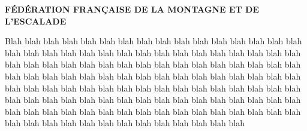 \documentclass{report}
\begin{document}
\begin{center}
\sf\bfseries
F\'ED\'ERATION FRAN\c{C}AISE DE LA MONTAGNE ET DE L'ESCALADE
\end{center}

Blah blah blah blah blah blah blah blah blah blah blah blah blah blah blah blah blah
blah blah blah blah blah blah blah blah blah blah blah blah blah blah blah blah blah blah
blah blah blah blah blah blah blah blah blah blah blah blah blah blah blah blah blah blah
blah blah blah blah blah blah blah blah blah blah blah blah blah blah blah blah blah blah
blah blah blah blah blah blah blah blah blah blah blah blah blah blah blah blah blah blah
blah blah blah blah blah blah blah blah blah blah blah blah blah blah blah blah blah blah
blah blah blah blah blah blah blah blah blah blah blah blah blah blah blah blah blah blah
\end{document}
